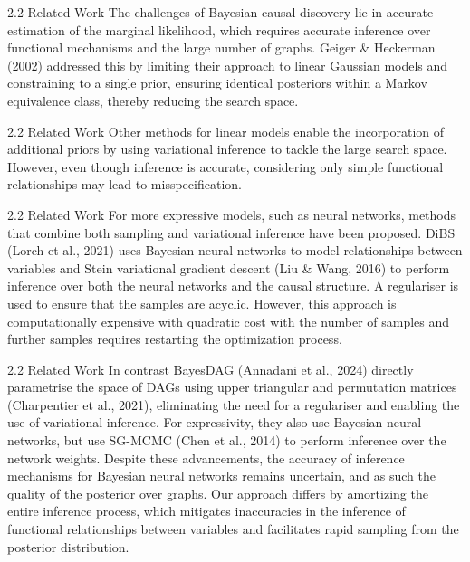 \documentclass[aspectratio=169,10pt]{beamer}
\begin{document}
\begin{frame}{2.2 Related Work}
The challenges of Bayesian causal discovery lie in accurate estimation of the marginal likelihood, which requires accurate inference over functional mechanisms and the large number of graphs. Geiger \& Heckerman (2002) addressed this by limiting their approach to linear Gaussian models and constraining to a single prior, ensuring identical posteriors within a Markov equivalence class, thereby reducing the search space.
\end{frame}

\begin{frame}{2.2 Related Work}
Other methods for linear models enable the incorporation of additional priors by using variational inference to tackle the large search space. However, even though inference is accurate, considering only simple functional relationships may lead to misspecification.
\end{frame}

\begin{frame}{2.2 Related Work}
\small
For more expressive models, such as neural networks, methods that combine both sampling and variational inference have been proposed. DiBS (Lorch et al., 2021) uses Bayesian neural networks to model relationships between variables and Stein variational gradient descent (Liu \& Wang, 2016) to perform inference over both the neural networks and the causal structure. A regulariser is used to ensure that the samples are acyclic. However, this approach is computationally expensive with quadratic cost with the number of samples and further samples requires restarting the optimization process.
\end{frame}

\begin{frame}{2.2 Related Work}
\small
In contrast BayesDAG (Annadani et al., 2024) directly parametrise the space of DAGs using upper triangular and permutation matrices (Charpentier et al., 2021), eliminating the need for a regulariser and enabling the use of variational inference. For expressivity, they also use Bayesian neural networks, but use SG-MCMC (Chen et al., 2014) to perform inference over the network weights. Despite these advancements, the accuracy of inference mechanisms for Bayesian neural networks remains uncertain, and as such the quality of the posterior over graphs. Our approach differs by amortizing the entire inference process, which mitigates inaccuracies in the inference of functional relationships between variables and facilitates rapid sampling from the posterior distribution.
\end{frame}
\end{document}
